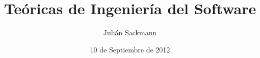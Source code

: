 \documentclass[]{article}
\title{Teóricas de Ingeniería del Software}
\author{ Julián Sackmann }
\date{10 de Septiembre de 2012}
\begin{document}
\ifpdf
{}
\else
{}
\fi

\setcounter{tocdepth}{4}

\newcommand{\ig}[2]{
\begin{center}
	\texttt{[image: \#2]}
\end{center}}
\newcommand{\subsubsubsection}[1]{\paragraph{#1}~\newline
 \indent }
\newcommand{\subsubsubsubsection}[1]{\subparagraph{#1}}
\newcommand{\flecha}[1]{\xrightarrow{\hspace*{0.3cm} #1 \hspace*{0.3cm}}}
\newcommand{\Flecha}[1]{\xRightarrow{\hspace*{0.3cm} #1 \hspace*{0.3cm}}}
\newcommand{\caja}[2]{\begin{center}
	\fbox{
		\parbox{#1\linewidth}{
			#2
		}
	}
\end{center}}
\renewcommand\contentsname{Índice}
\end{document}
